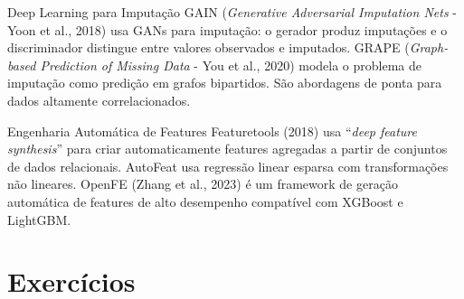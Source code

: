 \documentclass[12pt,a4paper]{article}
\begin{document}
\begin{estadoartebox}{Deep Learning para Imputação}
GAIN (\textit{Generative Adversarial Imputation Nets} - Yoon et al., 2018) usa GANs para imputação: o gerador produz imputações e o discriminador distingue entre valores observados e imputados. GRAPE (\textit{Graph-based Prediction of Missing Data} - You et al., 2020) modela o problema de imputação como predição em grafos bipartidos. São abordagens de ponta para dados altamente correlacionados.
\end{estadoartebox}

\begin{estadoartebox}{Engenharia Automática de Features}
Featuretools (2018) usa ``\textit{deep feature synthesis}'' para criar automaticamente features agregadas a partir de conjuntos de dados relacionais. AutoFeat usa regressão linear esparsa com transformações não lineares. OpenFE (Zhang et al., 2023) é um framework de geração automática de features de alto desempenho compatível com XGBoost e LightGBM.
\end{estadoartebox}

\section{Exercícios}
\end{document}
